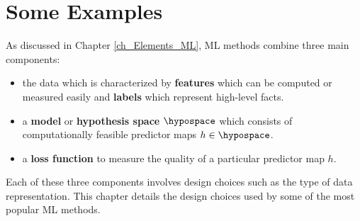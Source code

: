\documentclass[12pt]{report}
\begin{document}
\newpage
\chapter{Some Examples} 
\label{ch_some_examples}
As discussed in Chapter \ref{ch_Elements_ML}, ML methods combine 
three main components: 
\begin{itemize} 
\item the data which is characterized by {\bf features} which can be computed 
or measured easily and {\bf labels} which represent high-level facts. 
\item a {\bf model} or {\bf hypothesis space} $\hypospace$ which consists of 
computationally feasible predictor maps $h \in \hypospace$. 
\item a {\bf loss function} to measure the quality of a particular predictor map $h$. 
\end{itemize} 
Each of these three components involves design choices such as the type of 
data representation. This chapter details the design choices used by some of the 
most popular ML methods. 
\end{document}
